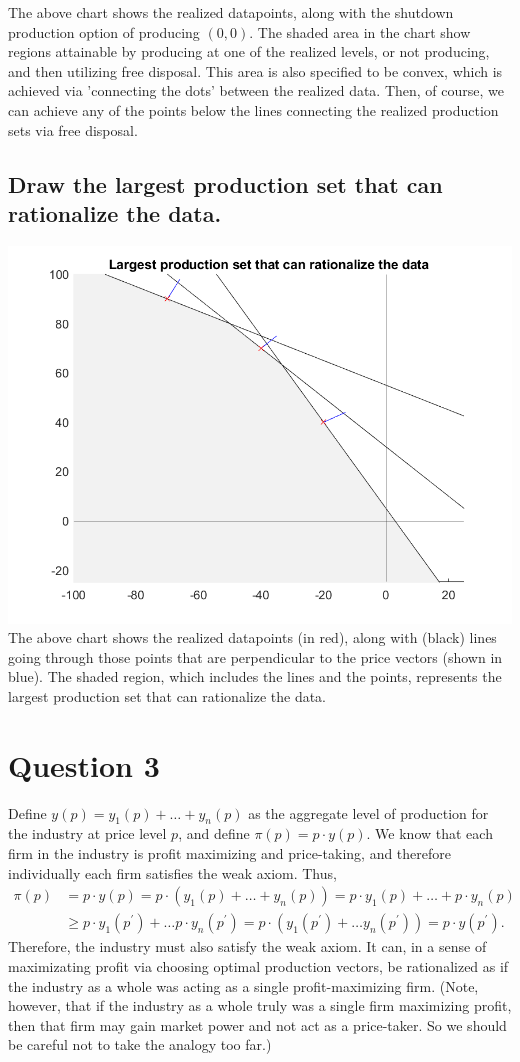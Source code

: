 \documentclass[11pt]{article} %
\begin{document}
The above chart shows the realized datapoints, along with the shutdown production option of producing $(0,0)$. The shaded area in the chart show regions attainable by producing at one of the realized levels, or not producing, and then utilizing free disposal. This area is also specified to be convex, which is achieved via 'connecting the dots' between the realized data. Then, of course, we can achieve any of the points below the lines connecting the realized production sets via free disposal.

\subsection{Draw the largest production set that can rationalize the data.}
\includegraphics{largestprod}
The above chart shows the realized datapoints (in red), along with (black) lines going through those points that are perpendicular to the price vectors (shown in blue). The shaded region, which includes the lines and the points, represents the largest production set that can rationalize the data.

\section{Question 3}
Define $y(p) = y_1(p) + \dots + y_n(p)$ as the aggregate level of production for the industry at price level $p$, and define $\pi (p) = p \cdot y(p)$. We know that each firm in the industry is profit maximizing and price-taking, and therefore individually each firm satisfies the weak axiom. Thus,
\begin{align*}
\pi (p) &= p \cdot y(p) = p \cdot (y_1(p) + \dots + y_n(p)) = p \cdot y_1(p) + \dots + p \cdot y_n(p) \\ &\geq p \cdot y_1(p^{'}) + \dots p \cdot y_n(p^{'}) 
= p \cdot (y_1(p^{'}) + \dots y_n(p^{'})) = p \cdot y(p^{'}).
\end{align*}
Therefore, the industry must also satisfy the weak axiom. It can, in a sense of maximizating profit via choosing optimal production vectors, be rationalized as if the industry as a whole was acting as a single profit-maximizing firm. (Note, however, that if the industry as a whole truly was a single firm maximizing profit, then that firm may gain market power and not act as a price-taker. So we should be careful not to take the analogy too far.)
\end{document}
